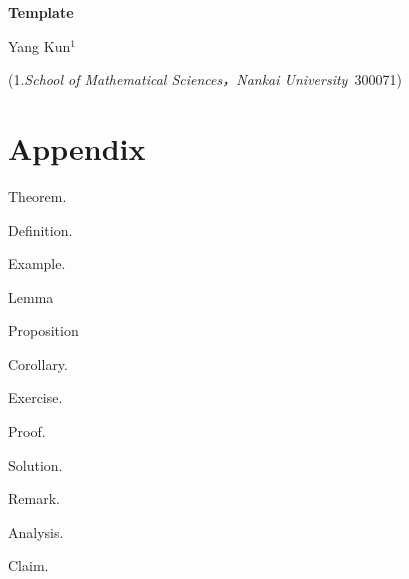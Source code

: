 \documentclass[a4paper,onecolumn,11pt]{article}
\newcommand{\yihao}{\fontsize{26pt}{39pt}\selectfont}
\newcommand{\xiaoer}{\fontsize{18pt}{27pt}\selectfont}
\begin{document}
\begin{center}%
    {\yihao \textbf{Template\uppercase\expandafter{}}}
\end{center}
\begin{center}
    {\xiaoer Yang Kun$^1$}\par%
    (1.\textit{School of Mathematical Sciences，Nankai University\,} 300071)%
\end{center}
\section{Appendix}
\begin{thmm}{}
	Theorem.
\end{thmm}
\begin{deff}{}
	Definition.
\end{deff}
\begin{eg}{}
	Example.
\end{eg}
\begin{lemm}{}
	Lemma
\end{lemm}
\begin{proo}{}
	Proposition
\end{proo}
\begin{coll}{}
	Corollary.
\end{coll}
\begin{ex}{}
	Exercise.
\end{ex}
\begin{pf}
	Proof.
\end{pf}
\begin{sol}
	Solution.
\end{sol}
\begin{rem}
	Remark.
\end{rem}
\begin{ana}
	Analysis.
\end{ana}
\begin{cla}
	Claim.
\end{cla}
\end{document}

